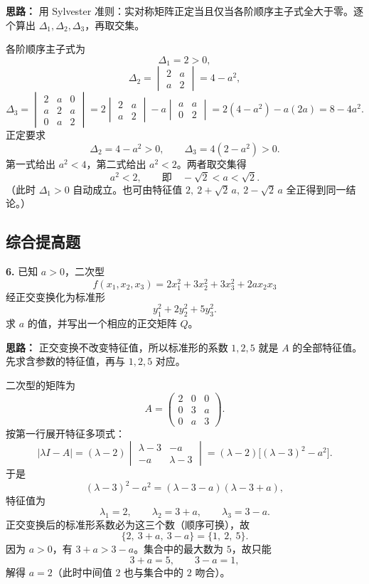 \ifshowsolutions%

\textbf{思路：} 用 Sylvester 准则：实对称矩阵正定当且仅当各阶顺序主子式全大于零。逐个算出 \(\Delta_1,\Delta_2,\Delta_3\)，再取交集。

各阶顺序主子式为
\[
\Delta_1=2>0,
\]
\[
\Delta_2=\begin{vmatrix}2&a\\a&2\end{vmatrix}=4-a^2,
\]
\[
\Delta_3=\begin{vmatrix}
2&a&0\\
a&2&a\\
0&a&2
\end{vmatrix}
=2\begin{vmatrix}2&a\\a&2\end{vmatrix}
-a\begin{vmatrix}a&a\\0&2\end{vmatrix}
=2(4-a^2)-a(2a)
=8-4a^2.
\]
正定要求
\[
\Delta_2=4-a^2>0,\qquad \Delta_3=4(2-a^2)>0.
\]
第一式给出 \(a^2<4\)，第二式给出 \(a^2<2\)。两者取交集得
\[
a^2<2,\qquad\text{即}\quad -\sqrt2<a<\sqrt2.
\]
（此时 \(\Delta_1>0\) 自动成立。也可由特征值 \(2,\ 2+\sqrt2\,a,\ 2-\sqrt2\,a\) 全正得到同一结论。）

\else \answerarea[8] \fi%

\subsection{综合提高题}

\textbf{6.} 已知 \(a>0\)，二次型
\[
f(x_1,x_2,x_3)=2x_1^2+3x_2^2+3x_3^2+2ax_2x_3
\]
经正交变换化为标准形
\[
y_1^2+2y_2^2+5y_3^2.
\]
求 \(a\) 的值，并写出一个相应的正交矩阵 \(Q\)。

\ifshowsolutions%

\textbf{思路：} 正交变换不改变特征值，所以标准形的系数 \(1,2,5\) 就是 \(A\) 的全部特征值。先求含参数的特征值，再与 \(1,2,5\) 对应。

二次型的矩阵为
\[
A=\begin{pmatrix}
2&0&0\\
0&3&a\\
0&a&3
\end{pmatrix}.
\]
按第一行展开特征多项式：
\[
|\lambda I-A|
=(\lambda-2)\begin{vmatrix}\lambda-3&-a\\-a&\lambda-3\end{vmatrix}
=(\lambda-2)\bigl[(\lambda-3)^2-a^2\bigr].
\]
于是
\[
(\lambda-3)^2-a^2=(\lambda-3-a)(\lambda-3+a),
\]
特征值为
\[
\lambda_1=2,\qquad \lambda_2=3+a,\qquad \lambda_3=3-a.
\]
正交变换后的标准形系数必为这三个数（顺序可换），故
\[
\{2,\ 3+a,\ 3-a\}=\{1,\ 2,\ 5\}.
\]
因为 \(a>0\)，有 \(3+a>3-a\)。集合中的最大数为 \(5\)，故只能
\[
3+a=5,\qquad 3-a=1,
\]
解得 \(a=2\)（此时中间值 \(2\) 也与集合中的 \(2\) 吻合）。

